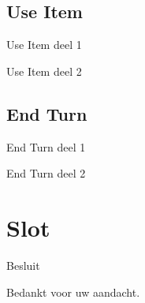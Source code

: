 \documentclass[t]{beamer}
\begin{document}
\subsection{Use Item}
\begin{frame}{Use Item deel 1}
\begin{center}
\end{center}
\end{frame}

\begin{frame}{Use Item deel 2}
\begin{center}
\end{center}
\end{frame}

\subsection{End Turn}
\begin{frame}{End Turn deel 1}
\begin{center}
\end{center}
\end{frame}

\begin{frame}{End Turn deel 2}
\begin{center}
\end{center}
\end{frame}


\section{Slot}
\begin{frame}{Besluit}
\vspace{0.8in}
\begin{center}
Bedankt voor uw aandacht.
\end{center}
\end{frame}
\end{document}
